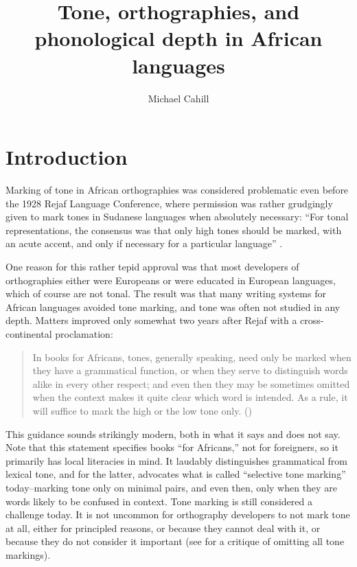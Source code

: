 \documentclass[output=paper]{langscibook}
\title{Tone, orthographies, and phonological depth in African languages}
\author{Michael Cahill}
\begin{document}
\maketitle

\section{Introduction}\label{sec:Introduction:1}

Marking of tone in African orthographies was considered problematic even before the 1928 Rejaf Language Conference, where permission was rather grudgingly given to mark tones in Sudanese languages when absolutely necessary: “For tonal representations, the consensus was that only high tones should be marked, with an acute accent, and only if necessary for a particular language” \citep{Miner2003}.

One reason for this rather tepid approval was that most developers of orthographies either were Europeans or were educated in European languages, which of course are not tonal. The result was that many writing systems for African languages avoided tone marking, and tone was often not studied in any depth. Matters improved only somewhat two years after Rejaf with a cross-continental proclamation: 

\begin{quote}
In books for Africans, tones, generally speaking, need only be marked when they have a grammatical function, or when they serve to distinguish words alike in every other respect; and even then they may be sometimes omitted when the context makes it quite clear which word is intended. As a rule, it will suffice to mark the high or the low tone only. (\citealt[14, referring to Rejaf and 12 other documents]{IIALC1930})
\end{quote}

This guidance sounds strikingly modern, both in what it says and does not say. Note that this statement specifies books “for Africans,” not for foreigners, so it primarily has local literacies in mind. It laudably distinguishes grammatical from lexical tone, and for the latter, advocates what is called “selective tone marking” today–marking tone only on minimal pairs, and even then, only when they are words likely to be confused in context. Tone marking is still considered a challenge today. It is not uncommon for orthography developers to not mark tone at all, either for principled reasons, or because they cannot deal with it, or because they do not consider it important (see \citealt{Cahill2000} for a critique of omitting all tone markings).
\end{document}
